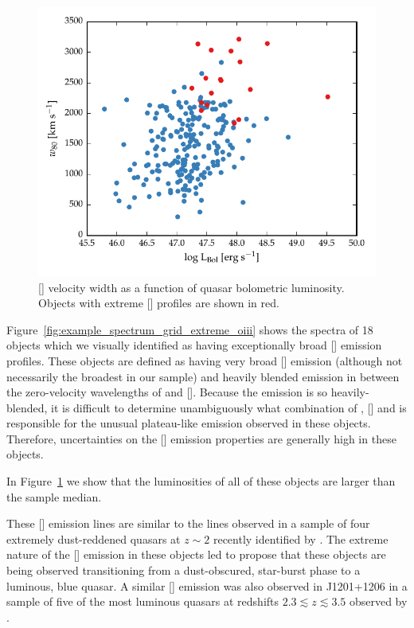\begin{figure}
    \centering
    \includegraphics[width=\columnwidth]{figures/chapter04/lum_w80.pdf} 
    \caption[{}]{[] velocity width as a function of quasar bolometric luminosity. Objects with extreme [] profiles are shown in red.}     
    \label{fig:lum_w80}
\end{figure}

Figure~\ref{fig:example_spectrum_grid_extreme_oiii} shows the spectra of 18 objects which we visually identified as having exceptionally broad [] emission profiles. 
These objects are defined as having very broad [] emission (although not necessarily the broadest in our sample) and heavily blended emission in between the zero-velocity wavelengths of \hb and []. 
Because the emission is so heavily-blended, it is difficult to determine unambiguously what combination of \hb, [] and  is responsible for the unusual plateau-like emission observed in these objects. 
Therefore, uncertainties on the [] emission properties are generally high in these objects. 

In Figure~\ref{fig:lum_w80} we show that the luminosities of all of these objects are larger than the sample median.

These [] emission lines are similar to the lines observed in a sample of four extremely dust-reddened quasars at $z\sim2$ recently identified by \citet{zakamska16}. 
The extreme nature of the [] emission in these objects led \citet{zakamska16} to propose that these objects are being observed transitioning from a dust-obscured, star-burst phase to a luminous, blue quasar. 
A similar [] emission was also observed in J1201+1206 in a sample of five of the most luminous quasars at redshifts $2.3 \lesssim z \lesssim 3.5$ observed by \citet{bischetti16}. 

